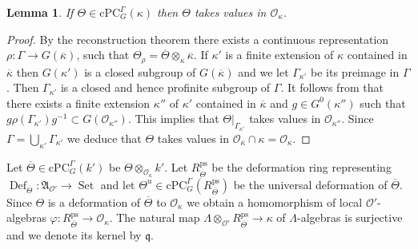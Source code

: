 \documentclass{amsart}
\newtheorem{lem}[prop]{Lemma}
\theoremstyle{definition}
\theoremstyle{remark}
\DeclareMathOperator{\Def}{Def}
\DeclareMathOperator{\Set}{Set}
\newcommand{\Aa}{\mathfrak A}
\newcommand{\OO}{\mathcal O}
\newcommand{\qq}{\mathfrak{q}}
\newcommand{\kappabar}{\overline{\kappa}}
\newcommand{\cPC}{\mathrm{cPC}}
\newcommand{\Thetabar}{\overline{\Theta}}
\newcommand{\ps}{\mathrm{ps}}
\begin{document}
\begin{lem}\label{values} If $\Theta\in \cPC^{\Gamma}_G(\kappa)$ then $\Theta$ takes values in $\OO_{\kappa}$.
\end{lem}
\begin{proof} By the reconstruction theorem \cite[Theorem 3.7]{quast} there 
exists a continuous representation $\rho: \Gamma \rightarrow G(\kappabar)$, such 
that $\Theta_{\rho}= \Thetabar\otimes_{\kappa} \kappabar$. If $\kappa'$ is a
finite extension of $\kappa$ contained in $\kappabar$ then 
$G(\kappa')$ is a closed subgroup of $G(\kappabar)$ and we let 
$\Gamma_{\kappa'}$ be its preimage in $\Gamma$. Then $\Gamma_{\kappa'}$
is a closed and hence profinite subgroup of $\Gamma$. It follows from 
\cite[Lemma 4.3]{cotner} that there exists a finite extension 
$\kappa''$ of $\kappa'$ contained in $\kappabar$ and $g\in G^0(\kappa'')$ 
such that $g \rho(\Gamma_{\kappa'}) g^{-1} \subset G(\OO_{\kappa''})$. 
This implies that $\Theta|_{\Gamma_{\kappa'}}$ takes values in $\OO_{\kappa''}$. 
Since $\Gamma= \bigcup_{\kappa'} \Gamma_{\kappa'}$ we deduce that 
$\Theta$ takes values in $\OO_{\kappabar} \cap \kappa = \OO_{\kappa}$.
\end{proof}

Let $\Thetabar\in \cPC^{\Gamma}_G(k')$ be $\Theta\otimes_{\OO_{\kappa}} k'$.
Let $R^{\ps}_{\Thetabar}$ be the deformation ring representing $\Def_{\Thetabar}:\Aa_{\OO'} \rightarrow \Set$ and let $\Theta^u\in \cPC^{\Gamma}_G(R^{\ps}_{\Thetabar})$ be the universal deformation of $\Thetabar$. Since $\Theta$ is a deformation 
of $\Thetabar$ to $\OO_{\kappa}$ we obtain a homomorphism of local 
$\OO'$-algebras $\varphi: R^{\ps}_{\Thetabar} \rightarrow \OO_{\kappa}$.
The natural map $\Lambda\otimes_{\OO'} R^{\ps}_{\Thetabar}\rightarrow \kappa$
of $\Lambda$-algebras is surjective and we denote its kernel by $\qq$.
\end{document}
